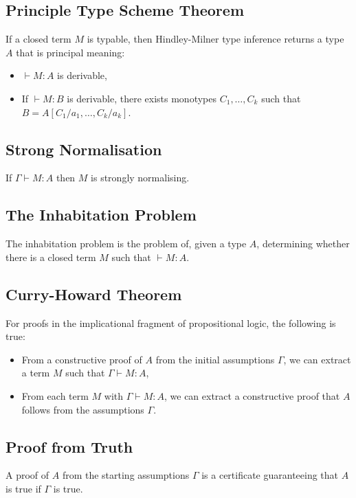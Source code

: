 \subsection{Principle Type Scheme Theorem}

If a closed term $M$ is typable, then Hindley-Milner type inference
returns a type $A$ that is principal meaning:
\begin{itemize}
    \item $\vdash M : A$ is derivable,
    \item If $\vdash M : B$ is derivable, there exists monotypes 
        $C_1, \ldots, C_k$ such that $B = A[C_1/a_1, \ldots, C_k/a_k]$.
\end{itemize}

\subsection{Strong Normalisation}

If $\Gamma \vdash M : A$ then $M$ is strongly normalising.

\subsection{The Inhabitation Problem}

The inhabitation problem is the problem of, given a type $A$, determining
whether there is a closed term $M$ such that $\vdash M : A$.

\subsection{Curry-Howard Theorem}

For proofs in the implicational fragment of propositional
logic, the following is true: \begin{itemize}
    \item From a constructive proof of $A$ from the initial assumptions
        $\Gamma$, we can extract a term $M$ such that $\Gamma \vdash M : A$,
    \item From each term $M$ with $\Gamma \vdash M : A$, we can extract
        a constructive proof that $A$ follows from the assumptions $\Gamma$.
\end{itemize}

\subsection{Proof from Truth}

A proof of $A$ from the starting assumptions $\Gamma$ is a certificate
guaranteeing that $A$ is true if $\Gamma$ is true.

